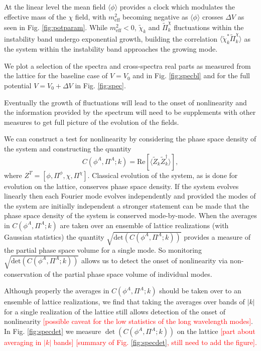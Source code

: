 At the linear level the mean field $\langle\phi\rangle$ provides a clock which modulates the effective mass of the $\chi$ field, with $m^2_\mathrm{eff}$ becoming negative as $\langle\phi\rangle$ crosses $\Delta V$ as seen in Fig. \ref{fig:potparam}. While $m^2_\mathrm{eff}<0$, $\tilde{\chi}_k$ and $\tilde{\Pi}^\chi_k$ fluctuations within the instability band undergo exponential growth, building the correlation $\langle\tilde{\chi}^*_k\tilde{\Pi}^\chi_k\rangle$ as the system within the instability band approaches the growing mode.

We plot a selection of the spectra and cross-spectra real parts as measured from the lattice for the baseline case of $V=V_0$ and in Fig. \ref{fig:specbl} and for the full potential $V=V_0 + \Delta V$ in Fig. \ref{fig:spec}.

\Fspecbl
\Fspec
\Fspecdet

Eventually the growth of fluctuations will lead to the onset of nonlinearity and the information provided by the spectrum will need to be supplements with other measures to get full picture of the evolution of the fields.

We can construct a test for nonlinearity by considering the phase space density of the system and constructing the quantity
\begin{equation}
  C(\phi^A,\Pi^A;k) =
  \mathrm{Re}\left[\langle\tilde{Z}_k\tilde{Z}_k^\dagger\rangle\right],
\end{equation}
where $Z^T=[\phi,\Pi^\phi,\chi,\Pi^\chi]$. Classical evolution of the system, as is done for evolution on the lattice, conserves phase space density. If the system evolves linearly then each Fourier mode evolves independently and provided the modes of the system are initially independent a stronger statement can be made that the phase space density of the system is conserved mode-by-mode. When the averages in $C(\phi^A,\Pi^A;k)$ are taken over an ensemble of lattice realizations (with Gaussian statistics) the quantity $\sqrt{\mathrm{det}(C(\phi^A,\Pi^A;k))}$ provides a measure of the partial phase space volume for a single mode. So monitoring $\sqrt{\mathrm{det}(C(\phi^A,\Pi^A;k))}$ allows us to detect the onset of nonlinearity via non-conservation of the partial phase space volume of individual modes.

Although properly the averages in $C(\phi^A,\Pi^A;k)$ should be taken over to an ensemble of lattice realizations, we find that taking the averages over bands of $|k|$ for a single realization of the lattice still allows detection of the onset of nonlinearity \textcolor{red}{[possible caveat for the low statistics of the long wavelength modes]}. In Fig. \ref{fig:specdet} we measure $\det(C(\phi^A,\Pi^A;k))$ on the lattice \textcolor{red}{[part about averaging in $|k|$ bands]} \textcolor{red}{[summary of Fig. \ref{fig:specdet}, still need to add the figure].}

